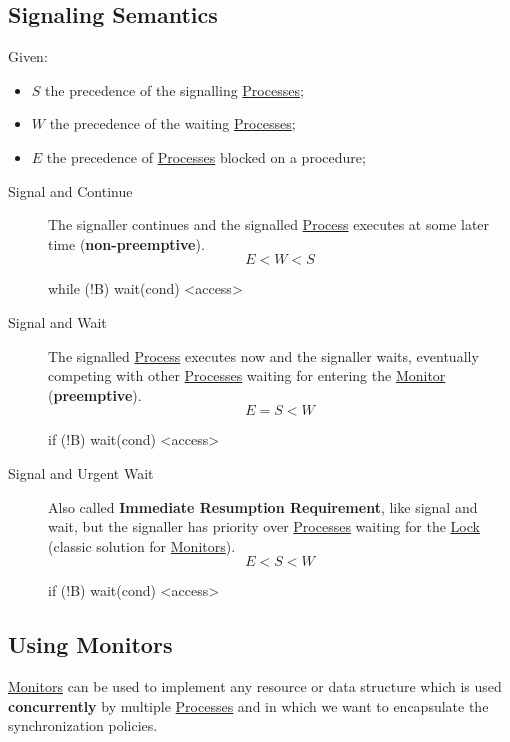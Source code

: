 \subsection{Signaling Semantics}\label{sub:pi_signaling_semantics} %
Given:
\begin{itemize}
    \item $S$ the precedence of the signalling \hyperref[def:process]{Processes};
    \item $W$ the precedence of the waiting \hyperref[def:process]{Processes};
    \item $E$ the precedence of \hyperref[def:process]{Processes} blocked on a procedure;
\end{itemize}
\begin{description}
    \item[Signal and Continue] The signaller continues and the signalled \hyperref[def:process]{Process} executes at some later time (\textbf{non-preemptive}).
        \[
            E < W < S
        \]
        \begin{codeblock}{}
    while (!B)
        wait(cond)
    <access>
        \end{codeblock}
    \item[Signal and Wait] The signalled \hyperref[def:process]{Process} executes now and the signaller waits, eventually competing with other \hyperref[def:process]{Processes} waiting for entering the \hyperref[def:monitor]{Monitor} (\textbf{preemptive}).
        \[
            E = S < W
        \]
        \begin{codeblock}{}
    if (!B)
        wait(cond)
    <access>
        \end{codeblock}
    \item[Signal and Urgent Wait] Also called \textbf{Immediate Resumption Requirement}, like signal and wait, but the signaller has priority over  \hyperref[def:process]{Processes} waiting for the \hyperref[sub:cp_locks]{Lock} (classic solution for \hyperref[def:monitor]{Monitors}).
        \[
            E < S < W
        \]
        \begin{codeblock}{}
    if (!B)
        wait(cond)
    <access>
        \end{codeblock}
\end{description}
%
\subsection{Using Monitors}\label{sub:pi_using_monitors} %
\hyperref[def:monitor]{Monitors} can be used to implement any resource or data structure which is used \textbf{concurrently} by multiple \hyperref[def:process]{Processes} and in which we want to encapsulate the synchronization policies.
%
